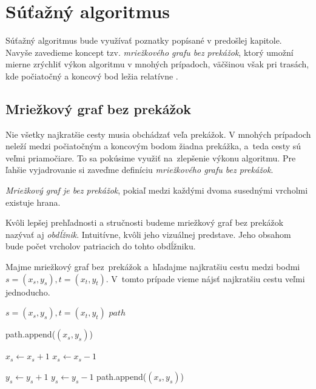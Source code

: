 \chapter{Súťažný algoritmus}
Súťažný algoritmus bude využívať poznatky popísané v predošlej kapitole. Navyše zavedieme koncept tzv. {\sl mriežkového grafu bez prekážok}, ktorý umožní mierne zrýchliť výkon algoritmu v mnohých prípadoch, väčšinou však pri trasách, kde počiatočný a koncový bod ležia relatívne .


\section{Mriežkový graf bez prekážok}
Nie všetky najkratšie cesty musia obchádzať veľa prekážok. 
V mnohých prípadoch neleží medzi počiatočným a koncovým bodom žiadna prekážka, a~teda cesty sú veľmi priamočiare. To sa pokúsime využiť na~zlepšenie výkonu algoritmu.
Pre ľahšie vyjadrovanie si zaveďme definíciu {\sl mriežkového grafu bez prekážok}.

\begin{define}
{\sl Mriežkový graf je bez prekážok}, 
pokiaľ medzi každými dvoma susednými vrcholmi existuje hrana.
\end{define}
Kvôli lepšej prehľadnosti a stručnosti budeme mriežkový graf bez prekážok nazývať aj {\sl obdĺžnik}.
Intuitívne, kvôli jeho vizuálnej predstave. Jeho obsahom bude počet vrcholov patriacich do tohto obdĺžniku.

Majme mriežkový graf bez~prekážok a~hľadajme najkratšiu cestu medzi bodmi $s=(x_s,y_s), t=(x_t,y_t)$.
V~tomto prípade vieme nájsť najkratšiu cestu veľmi jednoducho.

\begin{algorithm}
\caption{Nájdi najkratšiu cestu medzi dvoma bodmi $s$ a $t$ na mriežkovom grafe bez prekážok}
\label{alg1}
\begin{algorithmic}[1] %
\REQUIRE $s=(x_s,y_s), t=(x_t,y_t)$
\ENSURE $path$


\STATE path.append($(x_s, y_s)$)

		\STATE $x_s \leftarrow x_s + 1$
		\STATE $x_s \leftarrow x_s - 1$
	\ENDIF

		\STATE $y_s \leftarrow y_s + 1$
		\STATE $y_s \leftarrow y_s - 1$
	\ENDIF
	\STATE path.append($(x_s, y_s)$)
\ENDWHILE

\end{algorithmic}
\end{algorithm}



